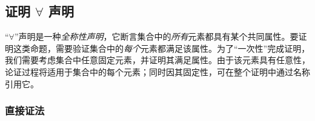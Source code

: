 \subsection{证明 $\forall$ 声明}\label{sec:section4.9.2}

``$\forall$''声明是一种\emph{全称性声明}，它断言集合中的\emph{所有}元素都具有某个共同属性。要证明这类命题，需要验证集合中的\emph{每个}元素都满足该属性。为了``一次性''完成证明，我们需要考虑集合中任意固定元素，并证明其满足属性。由于该元素具有任意性，论证过程将适用于集合中的每个元素；同时因其固定性，可在整个证明中通过名称引用它。

\subsubsection*{直接证法}

\begin{center}
\noindent {}
\end{center}


